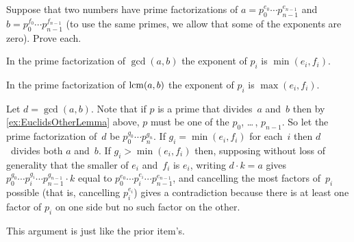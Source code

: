 \documentclass{ibl}
\begin{document}
\begin{ex}
Suppose that two numbers have prime factorizations 
of $a=p_0^{e_0}\cdots p_{n-1}^{e_{n-1}}$
and $b=p_0^{f_0}\cdots p_{n-1}^{f_{n-1}}$
(to use the same primes, we allow that some of the exponents are zero).
Prove each.
\begin{exes}
\item
  In the prime factorization of
  $\gcd(a,b)$ the exponent of $p_i$ is $\min(e_i,f_i)$.
\item In the prime factorization of $\operatorname{lcm}(a,b)$ the exponent of 
  $p_i$ is $\max(e_i,f_i)$.
\end{exes}
\begin{ans}
\begin{exes}
\item Let $d=\gcd(a,b)$.
  Note that if $p$ is a prime that divides~$a$ and~$b$ then
  by \ref{ex:EuclidsOtherLemma} above, $p$ must be one of the 
  $p_0$, \ldots\,, $p_{n-1}$.   
  So let the prime factorization of~$d$ be $p_0^{g_0}\cdots p_n^{g_n}$. 
  If $g_i=\min(e_i,f_i)$ for each~$i$ then $d$~divides both $a$ and~$b$.
  If $g_i>\min(e_i,f_i)$ then, supposing without loss of generality
  that the smaller of $e_i$ and~$f_i$ is $e_i$, writing
  $d\cdot k=a$ gives $p_0^{g_0}\cdots p_i^{g_i}\cdots p_{n-1}^{g_{n-1}}\cdot k$
  equal to $p_0^{e_0}\cdots p_i^{e_i}\cdots p_{n-1}^{e_{n-1}}$, and 
  cancelling the most factors of~$p_i$ possible (that is, cancelling $p_i^{e_i}$)
  gives a contradiction because there is at least one factor
  of $p_i$ on one side but no such factor on the other.
\item  This argument is just like the prior item's.  
\end{exes}
\end{ans}
\end{ex}
\end{document}
